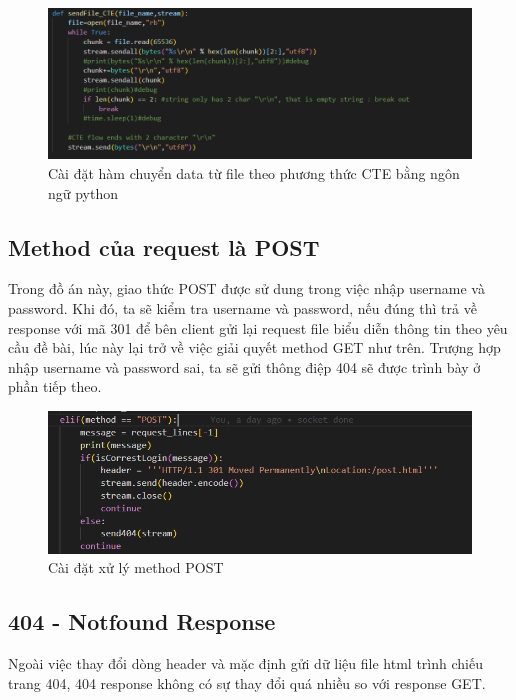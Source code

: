 \documentclass[14pt]{extreport}
\begin{document}
\begin{center}
    \begin{figure}[H]
    \begin{center}
     \includegraphics[scale=.8]{CTE implement.PNG}
    \end{center}
    \caption{Cài đặt hàm chuyển data từ file theo phương thức CTE bằng ngôn ngữ python}
    \end{figure}
\end{center}
\subsection{Method của request là POST}
Trong đồ án này, giao thức POST được sử dung trong việc nhập username và password. Khi đó, ta sẽ kiểm tra username và password, nếu đúng thì trả về response với mã 301 để bên client gửi lại request file biểu diễn thông tin theo yêu cầu đề bài, lúc này lại trở về việc giải quyết method GET như trên. Trượng hợp nhập username và password sai, ta sẽ gửi thông điệp 404 sẽ được trình bày ở phần tiếp theo. 
\begin{center}
    \begin{figure}[H]
    \begin{center}
     \includegraphics[scale=.8]{POST implement.PNG}
    \end{center}
    \caption{Cài đặt xử lý method POST}
    \end{figure}
\end{center}
\subsection{404 - Notfound Response}
Ngoài việc thay đổi dòng header và mặc định gửi dữ liệu file html trình chiếu trang 404, 404 response không có sự thay đổi quá nhiều so với response GET.
\end{document}
